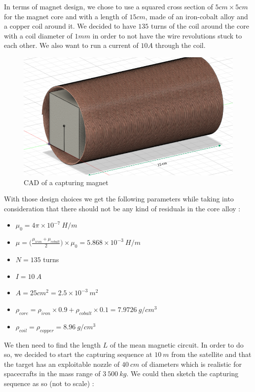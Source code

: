 In terms of magnet design, we chose to use a squared cross section of $5cm\times 5cm$ for the magnet core and with a length of $15cm$, made of an iron-cobalt alloy and a copper coil around it. We decided to have $135$ turns of the coil around the core with a coil diameter of $1mm$ in order to not have the wire revolutions stuck to each other. We also want to run a current of $10A$ through the coil.\\

\begin{figure}[H]
	\centering
	\includegraphics[width=\linewidth]{magnetCAD}
	\caption{CAD of a capturing magnet}
\end{figure}


With those design choices we get the following parameters while taking into consideration that there should not be any kind of residuals in the core alloy :

\begin{itemize}
	\item $\mu_0 = 4\pi \times 10^{-7}\ H/m$
	\item $\mu = \bigg(\frac{\mu_{iron}+\mu_{cobalt}}{2}\bigg)\times\mu_0=5.868\times10^{-3}\ H/m$
	\item $N=135$ turns
	\item $I = 10\ A$
	\item $A = 25cm^2=2.5\times10^{-3}\ m^2$
	\item $\rho_{core} = \rho_{iron}\times 0.9 + \rho_{cobalt}\times0.1 = 7.9726\ g/cm^3$
	\item $\rho_{coil} = \rho_{copper} = 8.96\ g/cm^3$
\end{itemize}

We then need to find the length $L$ of the mean magnetic circuit. In order to do so, we decided to start the capturing sequence at $10\ m$ from the satellite and that the target has an exploitable nozzle of $40\ cm$ of diameters which is realistic for spacecrafts in the mass range of $3\ 500\ kg$. We could then sketch the capturing sequence as so (not to scale) :


